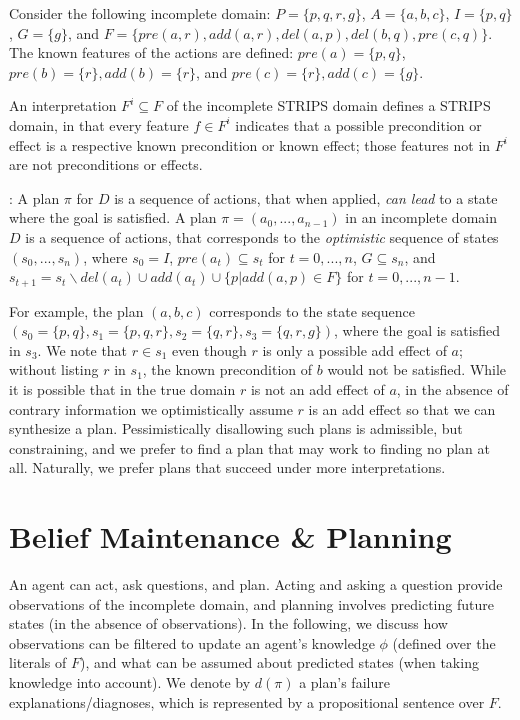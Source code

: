 \documentclass[letterpaper]{article}
\def\und#1{\noindent{\bf #1}:}
\begin{document}
Consider the following incomplete domain: $P = \{p, q, r, g\}$, ${A} =
\{{a}, {b}, {c}\}$, $I = \{p, q\}$,  $G= \{g\}$, and $F = \{pre(a, r), add(a, r),
del(a, p),del(b, q),pre(c, q) \}$.  The
known features of the actions are defined:  $pre({a}) = \{p, q\}$, $  pre({b}) =
\{r\},  add({b}) = \{r\}$, and  $ pre({c}) =
\{r\},  add({c}) = \{g\}$. 

An interpretation $F^i \subseteq F$ of the incomplete STRIPS domain
defines a STRIPS domain, in that every feature $f \in F^i$
indicates that a possible precondition or effect is a respective known
precondition or known effect; those features not in $F^i$ are
not preconditions or effects.   



\und{Incomplete STRIPS Plans} A plan $\pi$ for ${D}$ is a sequence of
actions, that when applied, {\em can lead} to a state where the goal is
satisfied.  A plan $\pi = ({a}_0,  ..., {a}_{n-1})$ in an incomplete
domain ${D}$ is a sequence of  actions, that corresponds to the {\em
optimistic} sequence of states $(s_0, ...,  s_n)$, where $s_0 = I$,
$pre({a}_t) \subseteq s_t$ for $t = 0,...,  n$, $G \subseteq s_n$,
and $s_{t+1} = s_t \backslash del({a}_t)  \cup
add({a}_t) \cup \{p | add(a, p) \in
F\}$ for $t = 0,...,
n-1$.

For example, the plan $({a}, {b}, {c})$ corresponds to the
state sequence $(s_0 = \{p, q\}, s_1 = \{p, q, r\}, s_2 = \{q, r\}, s_3 = \{q,
r, g\})$, where the goal is satisfied in $s_3$.  We note that $r \in s_1$ even
though $r$ is only a possible add effect of $a$; without listing $r$ in $s_1$,
the known precondition of $b$ would not be satisfied.  While it is possible that
in the true domain $r$ is not an add effect of $a$, in the absence of contrary
information we optimistically assume $r$ is an add effect so that we can
synthesize a plan.   Pessimistically disallowing such plans is admissible, but
constraining, and we prefer to find a plan that may work to finding no plan at
all.  Naturally, we prefer plans that succeed under more interpretations.

\section{Belief Maintenance \& Planning}

An agent can act, ask questions, and plan.  Acting and asking a question provide
observations of the incomplete domain, and planning involves predicting future
states (in the absence of observations).  In the following, we discuss how
observations can be filtered to update an agent's knowledge $\phi$ (defined over
the literals of $F$), and what can be assumed about predicted states
(when taking knowledge into account).  We denote by $d(\pi)$ a plan's failure
explanations/diagnoses, which is represented by a propositional sentence over
$F$.
\end{document}
